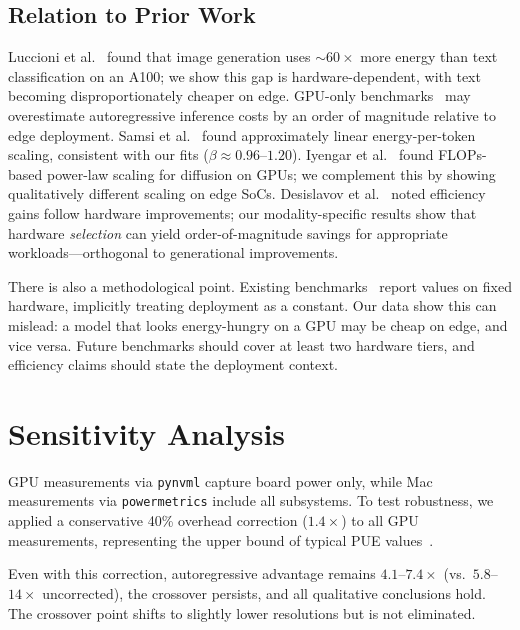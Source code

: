\documentclass[acmlarge,manuscript,screen,review]{acmart}
\begin{document}
\subsection{Relation to Prior Work}

Luccioni et al.~\cite{luccioni2024power} found that image generation uses ${\sim}60\times$ more energy than text classification on an A100; we show this gap is hardware-dependent, with text becoming disproportionately cheaper on edge. GPU-only benchmarks~\cite{you2023zeus} may overestimate autoregressive inference costs by an order of magnitude relative to edge deployment. Samsi et al.~\cite{samsi2023words} found approximately linear energy-per-token scaling, consistent with our fits ($\beta \approx 0.96$--$1.20$). Iyengar et al.~\cite{castano2025energy} found FLOPs-based power-law scaling for diffusion on GPUs; we complement this by showing qualitatively different scaling on edge SoCs. Desislavov et al.~\cite{desislavov2023trends} noted efficiency gains follow hardware improvements; our modality-specific results show that hardware \emph{selection} can yield order-of-magnitude savings for appropriate workloads---orthogonal to generational improvements.

There is also a methodological point. Existing benchmarks~\cite{you2023zeus,jegham2025hungry,luccioni2024power} report values on fixed hardware, implicitly treating deployment as a constant. Our data show this can mislead: a model that looks energy-hungry on a GPU may be cheap on edge, and vice versa. Future benchmarks should cover at least two hardware tiers, and efficiency claims should state the deployment context.

\section{Sensitivity Analysis}
\label{sec:sensitivity}

GPU measurements via \texttt{pynvml} capture board power only, while Mac measurements via \texttt{powermetrics} include all subsystems. To test robustness, we applied a conservative 40\% overhead correction ($1.4\times$) to all GPU measurements, representing the upper bound of typical PUE values~\cite{wu2022sustainable}.

Even with this correction, autoregressive advantage remains $4.1$--$7.4\times$ (vs.\ $5.8$--$14\times$ uncorrected), the crossover persists, and all qualitative conclusions hold. The crossover point shifts to slightly lower resolutions but is not eliminated.
\end{document}
